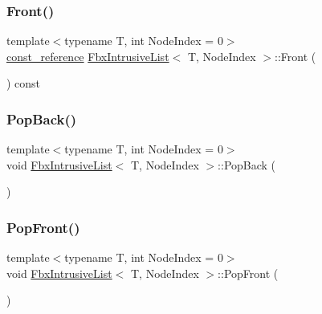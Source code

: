 \mbox{\label{class_fbx_intrusive_list_ae823b1f0c9b7fefde5a5957f852d2d98}} 
\subsubsection{\texorpdfstring{Front()}{Front()}\hspace{0.1cm}{\footnotesize\ttfamily [2/2]}}
{\footnotesize\ttfamily template$<$typename T, int Node\+Index = 0$>$ \\
\hyperlink{class_fbx_intrusive_list_a21904cb72c0ccae9d5c0b9f171befeb8}{const\+\_\+reference} \hyperlink{class_fbx_intrusive_list}{Fbx\+Intrusive\+List}$<$ T, Node\+Index $>$\+::Front (\begin{DoxyParamCaption}{ }\end{DoxyParamCaption}) const}

\mbox{\label{class_fbx_intrusive_list_aed150ddaff259ff38993daf555c7a853}} 
\subsubsection{\texorpdfstring{Pop\+Back()}{PopBack()}}
{\footnotesize\ttfamily template$<$typename T, int Node\+Index = 0$>$ \\
void \hyperlink{class_fbx_intrusive_list}{Fbx\+Intrusive\+List}$<$ T, Node\+Index $>$\+::Pop\+Back (\begin{DoxyParamCaption}{ }\end{DoxyParamCaption})}

\mbox{\label{class_fbx_intrusive_list_ad332103f8b12b341d38115cd1c5cd3ad}} 
\subsubsection{\texorpdfstring{Pop\+Front()}{PopFront()}}
{\footnotesize\ttfamily template$<$typename T, int Node\+Index = 0$>$ \\
void \hyperlink{class_fbx_intrusive_list}{Fbx\+Intrusive\+List}$<$ T, Node\+Index $>$\+::Pop\+Front (\begin{DoxyParamCaption}{ }\end{DoxyParamCaption})}

